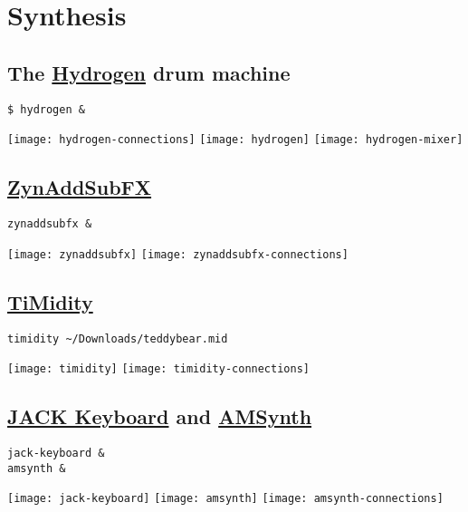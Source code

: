 
\chapter{Synthesis}

\section{The \href{http://www.hydrogen-music.org/hcms}{Hydrogen} drum machine}
\begin{verbatim}
$ hydrogen &
\end{verbatim}
\begin{center}
  \texttt{[image: hydrogen-connections]}
  \texttt{[image: hydrogen]}
  \texttt{[image: hydrogen-mixer]}
\end{center}

\section{\href{http://zynaddsubfx.sourceforge.net/}{ZynAddSubFX}}
\begin{verbatim}
zynaddsubfx &
\end{verbatim}

\begin{center}
  \texttt{[image: zynaddsubfx]}
  \texttt{[image: zynaddsubfx-connections]}
\end{center}

\section{\href{http://timidity.sourceforge.net/}{TiMidity}}
\begin{verbatim}
timidity ~/Downloads/teddybear.mid
\end{verbatim}
\begin{center}
  \texttt{[image: timidity]}
  \texttt{[image: timidity-connections]}
\end{center}

\section{\href{http://jack-keyboard.sourceforge.net/}{JACK Keyboard} and \href{https://code.google.com/p/amsynth/}{AMSynth}}
\begin{verbatim}
jack-keyboard &
amsynth &
\end{verbatim}

\begin{center}
  \texttt{[image: jack-keyboard]}
  \texttt{[image: amsynth]}
  \texttt{[image: amsynth-connections]}
\end{center}

